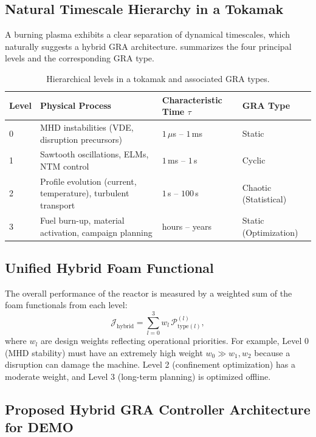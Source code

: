 \documentclass[12pt,a4paper]{article}
\begin{document}
\subsection{Natural Timescale Hierarchy in a Tokamak}

A burning plasma exhibits a clear separation of dynamical timescales, which naturally suggests a hybrid GRA architecture.  summarizes the four principal levels and the corresponding GRA type.

\begin{table}[H]
\centering
\caption{Hierarchical levels in a tokamak and associated GRA types.}
\label{tab:hierarchy}
\begin{tabular}{@{}llll@{}}
\toprule
Level & Physical Process & Characteristic Time $\tau$ & GRA Type \\
\midrule
0 & MHD instabilities (VDE, disruption precursors) & $1\,\mu$s -- $1$\,ms & Static \\
1 & Sawtooth oscillations, ELMs, NTM control & $1$\,ms -- $1$\,s & Cyclic \\
2 & Profile evolution (current, temperature), turbulent transport & $1$\,s -- $100$\,s & Chaotic (Statistical) \\
3 & Fuel burn-up, material activation, campaign planning & hours -- years & Static (Optimization) \\
\bottomrule
\end{tabular}
\end{table}

\subsection{Unified Hybrid Foam Functional}

The overall performance of the reactor is measured by a weighted sum of the foam functionals from each level:
\begin{equation}
\mathcal{J}_{\text{hybrid}} = \sum_{l=0}^{3} w_l \, \mathcal{P}_{\text{type}(l)}^{(l)},
\label{eq:Jhybrid}
\end{equation}
where $w_l$ are design weights reflecting operational priorities. For example, Level 0 (MHD stability) must have an extremely high weight $w_0 \gg w_1, w_2$ because a disruption can damage the machine. Level 2 (confinement optimization) has a moderate weight, and Level 3 (long-term planning) is optimized offline.

\subsection{Proposed Hybrid GRA Controller Architecture for DEMO}
\end{document}
